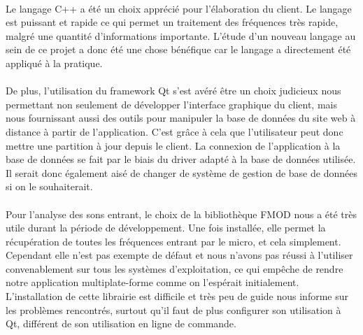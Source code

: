\paragraph{}
Le langage C++ a été un choix apprécié pour l'élaboration du client. Le langage est puissant et rapide ce qui permet un 
traitement des fréquences très rapide, malgré une quantité d'informations importante. L'étude d'un nouveau langage au sein 
de ce projet a donc été une chose bénéfique car le langage a directement été appliqué à la pratique. 

\paragraph{}
De plus, l'utilisation du framework Qt s'est avéré être un choix judicieux nous permettant non seulement de développer l'interface graphique du client, mais nous fournissant aussi des outils pour manipuler la base de données du site web à distance à partir de l'application. C'est grâce à cela que l'utilisateur peut donc mettre une partition à jour depuis le client. La connexion de l'application à la base de données se fait par le biais du driver adapté 
à la base de données utilisée. Il serait donc également aisé de changer de système de gestion de base de données si on le souhaiterait. 

\paragraph{}
Pour l'analyse des sons entrant, le choix de la bibliothèque FMOD nous a été très utile durant la période de développement. Une fois installée, 
elle permet la récupération de toutes les fréquences entrant par le micro, et cela simplement. \\
Cependant elle n'est pas exempte de défaut et nous n'avons pas réussi à l'utiliser convenablement sur tous les systèmes d'exploitation, ce qui empêche de rendre notre application multiplate-forme comme on l'espérait initialement. L'installation de cette librairie est difficile et 
très peu de guide nous informe sur les problèmes rencontrés, surtout qu'il faut de plus configurer son utilisation à Qt, différent de son utilisation 
en ligne de commande. 

